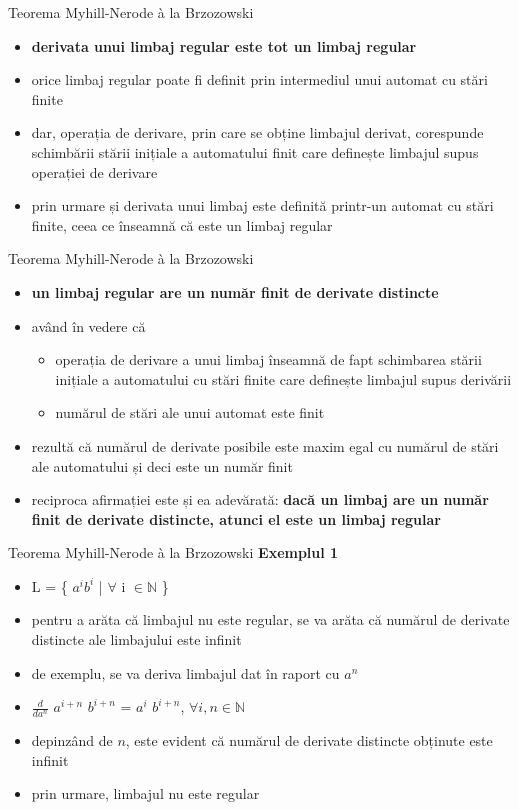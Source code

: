 \documentclass[pdf]{beamer}
\begin{document}
\begin{frame}{Teorema Myhill-Nerode à la Brzozowski}
\begin{itemize}
\item
\textbf{derivata unui limbaj regular este tot un limbaj regular}
\item
orice limbaj regular poate fi definit prin intermediul unui automat cu stări finite
\item
dar, operația de derivare, prin care se obține limbajul derivat, corespunde schimbării stării inițiale a automatului finit care definește limbajul supus operației de derivare
\item
prin urmare și derivata unui limbaj este definită printr-un automat cu stări finite, ceea ce înseamnă că este un limbaj regular
\end{itemize}
\end{frame}



\begin{frame}{Teorema Myhill-Nerode à la Brzozowski}
\begin{itemize}
\item
\textbf{un limbaj regular are un număr finit de derivate distincte}
\item
având în vedere că 
\begin{itemize}
\item
operația de derivare a unui limbaj înseamnă de fapt schimbarea stării inițiale a automatului cu stări finite care definește limbajul supus derivării 
\item
numărul de stări ale unui automat este finit
\end{itemize}
\item
rezultă că numărul de derivate posibile este maxim egal cu numărul de stări ale automatului și deci este un număr finit
\item
reciproca afirmației este și ea adevărată: \textbf{dacă un limbaj are un număr finit de derivate distincte, atunci el este un limbaj regular}
\end{itemize}
\end{frame}



\begin{frame}{Teorema Myhill-Nerode à la Brzozowski}
\textbf{Exemplul 1}
\begin{itemize}
\item
L = \{ $a^{i} b^{i}$ | $\forall$ i $\in \mathbb{N}$ \}
\item
pentru a arăta că limbajul nu este regular, se va arăta că numărul de derivate distincte ale limbajului este infinit
\item
de exemplu, se va deriva limbajul dat în raport cu $a^n$
\item
$\frac{d}{da^{n}}$ $a^{i+n}$ $b^{i+n}$ = $a^{i}$ $b^{i+n}$, $\forall i,n \in \mathbb{N}$
\item
depinzând de $n$, este evident că numărul de derivate distincte obținute este infinit
\item
prin urmare, limbajul nu este regular
\end{itemize}
\end{frame}
\end{document}
